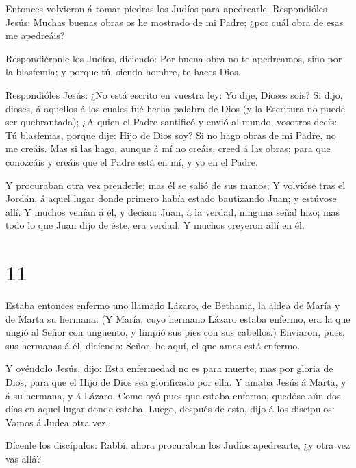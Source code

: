  Entonces volvieron á tomar piedras los Judíos para
apedrearle.  Respondióles Jesús: Muchas buenas obras os he
mostrado de mi Padre; ¿por cuál obra de esas me apedreáis?

 Respondiéronle los Judíos, diciendo: Por buena obra no te
apedreamos, sino por la blasfemia; y porque tú, siendo hombre, te haces
Dios.

 Respondióles Jesús: ¿No está escrito en vuestra ley: Yo
dije, Dioses sois?  Si dijo, dioses, á aquellos á los
cuales fué hecha palabra de Dios (y la Escritura no puede ser
quebrantada);  ¿A quien el Padre santificó y envió al
mundo, vosotros decís: Tú blasfemas, porque dije: Hijo de Dios soy?
 Si no hago obras de mi Padre, no me creáis. 
Mas si las hago, aunque á mí no creáis, creed á las obras; para que
conozcáis y creáis que el Padre está en mí, y yo en el Padre.

 Y procuraban otra vez prenderle; mas él se salió de sus
manos;  Y volvióse tras el Jordán, á aquel lugar donde
primero había estado bautizando Juan; y estúvose allí.  Y
muchos venían á él, y decían: Juan, á la verdad, ninguna señal hizo; mas
todo lo que Juan dijo de éste, era verdad.  Y muchos
creyeron allí en él.

\hypertarget{section-10}{%
\section{11}\label{section-10}}

 Estaba entonces enfermo uno llamado Lázaro, de Bethania, la
aldea de María y de Marta su hermana.  (Y María, cuyo
hermano Lázaro estaba enfermo, era la que ungió al Señor con ungüento, y
limpió sus pies con sus cabellos.)  Enviaron, pues, sus
hermanas á él, diciendo: Señor, he aquí, el que amas está enfermo.

 Y oyéndolo Jesús, dijo: Esta enfermedad no es para muerte,
mas por gloria de Dios, para que el Hijo de Dios sea glorificado por
ella.  Y amaba Jesús á Marta, y á su hermana, y á Lázaro.
 Como oyó pues que estaba enfermo, quedóse aún dos días en
aquel lugar donde estaba.  Luego, después de esto, dijo á
los discípulos: Vamos á Judea otra vez.

 Dícenle los discípulos: Rabbí, ahora procuraban los Judíos
apedrearte, ¿y otra vez vas allá?

